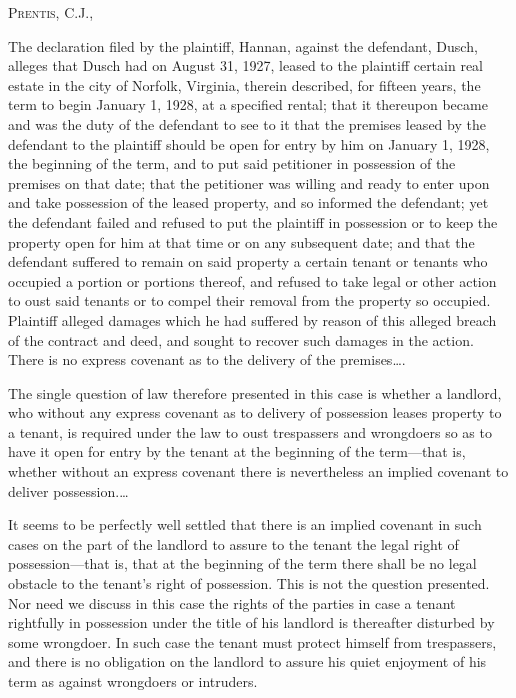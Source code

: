 

\opinion \textsc{Prentis}, C.J.,

The declaration filed by the plaintiff, Hannan, against the defendant, Dusch,
alleges that Dusch had on August 31, 1927, leased to the plaintiff certain real
estate in the city of Norfolk, Virginia, therein described, for fifteen years,
the term to begin January 1, 1928, at a specified rental; that it thereupon
became and was the duty of the defendant to see to it that the premises leased
by the defendant to the plaintiff should be open for entry by him on January 1,
1928, the beginning of the term, and to put said petitioner in possession of
the premises on that date; that the petitioner was willing and ready to enter
upon and take possession of the leased property, and so informed the defendant;
yet the defendant failed and refused to put the plaintiff in possession or to
keep the property open for him at that time or on any subsequent date; and that
the defendant suffered to remain on said property a certain tenant or tenants
who occupied a portion or portions thereof, and refused to take legal or other
action to oust said tenants  or to compel their removal from the property so
occupied. Plaintiff alleged damages which he had suffered by reason of this
alleged breach of the contract and deed, and sought to recover such damages in
the action. There is no express covenant as to the delivery of the
premises\ldots.

The single question of law therefore presented in this case is whether a
landlord, who without any express covenant as to delivery of possession leases
property to a tenant, is required under the law to oust trespassers and
wrongdoers so as to have it open for entry by the tenant at the beginning of
the term---that is, whether without an express covenant there is nevertheless
an implied covenant to deliver possession.\ldots

It seems to be perfectly well settled that there is an implied covenant in such
cases on the part of the landlord to assure to the tenant the legal right of
possession---that is, that at the beginning of the term there shall be no
legal obstacle to the tenant's right of possession. This is not the question
presented. Nor need we discuss in this case the rights of the parties in case a
tenant rightfully in possession under the title of his landlord is thereafter
disturbed by some wrongdoer. In such case the tenant must protect himself from
trespassers, and there is no obligation on the landlord to assure his quiet
enjoyment of his term as against wrongdoers or intruders.


